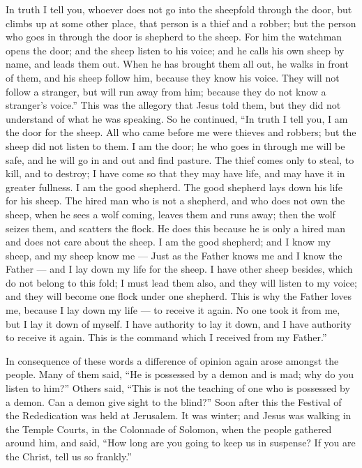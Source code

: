  In truth I tell you, whoever does not go into the sheepfold
through the door, but climbs up at some other place, that person is a
thief and a robber;  but the person who goes in through the
door is shepherd to the sheep.  For him the watchman opens
the door; and the sheep listen to his voice; and he calls his own sheep
by name, and leads them out.  When he has brought them all
out, he walks in front of them, and his sheep follow him, because they
know his voice.  They will not follow a stranger, but will
run away from him; because they do not know a stranger's voice.''
 This was the allegory that Jesus told them, but they did
not understand of what he was speaking.  So he continued,
``In truth I tell you, I am the door for the sheep.  All who
came before me were thieves and robbers; but the sheep did not listen to
them.  I am the door; he who goes in through me will be
safe, and he will go in and out and find pasture.  The
thief comes only to steal, to kill, and to destroy; I have come so that
they may have life, and may have it in greater fullness.  I
am the good shepherd. The good shepherd lays down his life for his
sheep.  The hired man who is not a shepherd, and who does
not own the sheep, when he sees a wolf coming, leaves them and runs
away; then the wolf seizes them, and scatters the flock. 
He does this because he is only a hired man and does not care about the
sheep.  I am the good shepherd; and I know my sheep, and my
sheep know me ---  Just as the Father knows me and I know
the Father --- and I lay down my life for the sheep.  I
have other sheep besides, which do not belong to this fold; I must lead
them also, and they will listen to my voice; and they will become one
flock under one shepherd.  This is why the Father loves me,
because I lay down my life --- to receive it again.  No one
took it from me, but I lay it down of myself. I have authority to lay it
down, and I have authority to receive it again. This is the command
which I received from my Father.''

 In consequence of these words a difference of opinion
again arose amongst the people.  Many of them said, ``He is
possessed by a demon and is mad; why do you listen to him?''
 Others said, ``This is not the teaching of one who is
possessed by a demon. Can a demon give sight to the blind?''
 Soon after this the Festival of the Rededication was held
at Jerusalem.  It was winter; and Jesus was walking in the
Temple Courts, in the Colonnade of Solomon,  when the
people gathered around him, and said, ``How long are you going to keep
us in suspense? If you are the Christ, tell us so frankly.''

